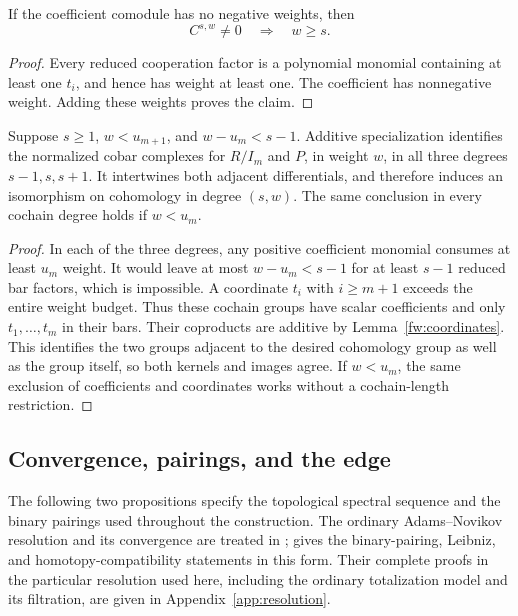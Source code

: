 \begin{lemma}
\label{fw:normalized-bound}
If the coefficient comodule has no negative weights, then
\begin{equation}
 C^{s,w}\ne0\quad\Longrightarrow\quad w\geq s.
 \label{fw:positivity}
\end{equation}
\end{lemma}

\begin{proof}
Every reduced cooperation factor is a polynomial monomial containing at
least one $t_i$, and hence has weight at least one.  The coefficient has
nonnegative weight.  Adding these weights proves the claim.
\end{proof}

\begin{lemma}
\label{fw:range-comparison}
Suppose $s\geq1$, $w<u_{m+1}$, and
$w-u_m<s-1$.  Additive specialization identifies the normalized cobar
complexes for $R/I_m$ and $P$, in weight $w$, in all three degrees
$s-1,s,s+1$.  It intertwines both adjacent differentials, and therefore
induces an isomorphism on cohomology in degree $(s,w)$.
The same conclusion in every cochain degree holds if $w<u_m$.
\end{lemma}

\begin{proof}
In each of the three degrees, any positive coefficient monomial consumes
at least $u_m$ weight.  It would leave at most $w-u_m<s-1$ for at least
$s-1$ reduced bar factors, which is impossible.  A coordinate $t_i$ with
$i\geq m+1$ exceeds the entire weight budget.  Thus these cochain groups
have scalar coefficients and only $t_1,\ldots,t_m$ in their bars.  Their
coproducts are additive by Lemma~\ref{fw:coordinates}.  This identifies
the two groups adjacent to the desired cohomology group as well as the
group itself, so both kernels and images agree.  If $w<u_m$, the same
exclusion of coefficients and coordinates works without a cochain-length
restriction.
\end{proof}

\subsection{Convergence, pairings, and the edge}

The following two propositions specify the topological spectral sequence and
the binary pairings used throughout the construction. The ordinary
Adams--Novikov resolution and its convergence are treated in
\citet[Theorems~2.2.3, 2.2.13--2.2.14]{Ravenel2004};
\citet[Theorem~2.3.3]{Ravenel2004} gives the binary-pairing, Leibniz,
and homotopy-compatibility statements in this form. Their complete proofs
in the particular resolution used here,
including the ordinary totalization model and its filtration, are given in
Appendix~\ref{app:resolution}.

